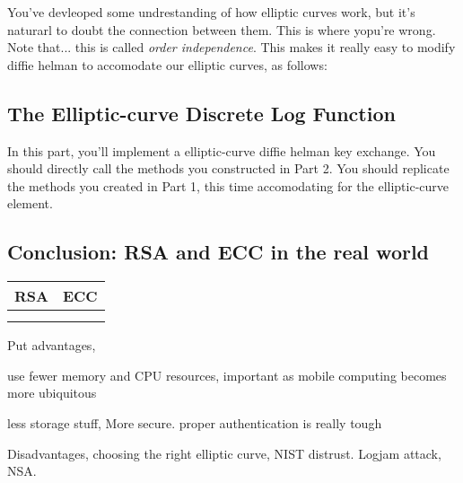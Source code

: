 \documentclass{article}
\begin{document}
You've devleoped some undrestanding of how elliptic curves work, but it's naturarl to doubt the connection between them. This is where yopu're wrong. Note that... this is called \textit{order independence}. This makes it really easy to modify diffie helman to accomodate our elliptic curves, as follows:


\subsection*{The Elliptic-curve Discrete Log Function}

\begin{tcolorbox}
    In this part, you'll implement a elliptic-curve diffie helman key exchange. You should directly call the methods you constructed in Part 2. You should replicate the methods you created in Part 1, this time accomodating for the elliptic-curve element.
\end{tcolorbox}



\subsection*{Conclusion: RSA and ECC in the real world}


\begin{center}
    \begin{tabular}{c|c}
        RSA & ECC \\
        \hline \\
         & 
    \end{tabular}
\end{center}

Put advantages, 

use fewer memory and CPU resources, important as mobile computing becomes more ubiquitous



less storage stuff, More secure. proper authentication is really tough

Disadvantages, choosing the right elliptic curve, NIST distrust. Logjam attack, NSA.
\end{document}
